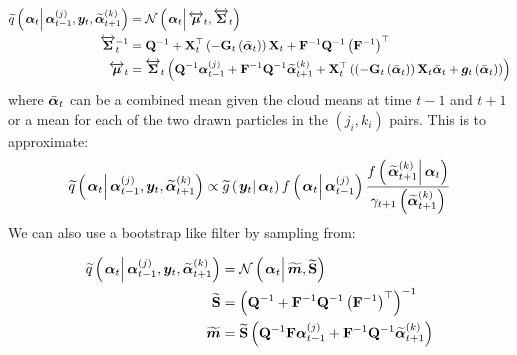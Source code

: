 \begin{equation}\begin{split}
	\IDAproxC{\vec{\alpha}_t}{\partic{\vec{\alpha}}{t-1}{j},\vec{y}_t, \particB{\vec{\alpha}}{t+1}{k}}  &=   %
		\normalC{\vec{\alpha}_t}{\vecLRarrow{\mu}_t}{\matLRarrow{\Sigma}_t} \\
%
	\matLRarrow{\Sigma}_t^{-1} &= 
		\mat{Q}^{-1} + 
		\mat{X}_t^\top\Lparen{-\mat{G}_t\Lparen{\vecb{\alpha}_{t}}}
		\mat{X}_t + \mat{F}^{-1}\mat{Q}^{-1}\Lparen{\mat{F}^{-1}}^\top  \\
%
	\vecLRarrow{\mu}_t 
	 &=  \matLRarrow{\Sigma}_t \Lparen{
		\mat{Q}^{-1}\partic{\vec{\alpha}}{t-1}{j} + 
		\mat{F}^{-1}\mat{Q}^{-1}\particB{\vec{\alpha}}{t + 1}{k} + 
		\mat{X}_t^\top
		\Lparen{
			\Lparen{-\mat{G}_t\Lparen{\vecb{\alpha}_{t}}}
			\mat{X}_t\vecb{\alpha}_{t} +
			\vec{g}_t\Lparen{\vecb{\alpha}_{t}}
		}}
\end{split}\end{equation}%
%
where $\bar{\bm{\alpha}}_{t}$ can be a combined mean given the cloud means at time $t - 1$ and $t + 1$ or a mean for each of the  two drawn particles in the $(j_i,k_i)$ pairs. This is to approximate:
%
%
\begin{equation}\begin{split}
	\IDAproxC{\vec{\alpha}_t}{\partic{\vec{\alpha}}{t-1}{j},\vec{y}_t, \particB{\vec{\alpha}}{t+1}{k}} \propto %
%
	\optorC{\widetilde{g}}{\vec{y}_t}{\vec{\alpha}_t}
		\optorC{f}{\vec{\alpha}_t}{\partic{\vec{\alpha}}{t-1}{j}}
		\frac{
			\optorC{f}{\particB{\vec{\alpha}}{t+1}{k}}{\vec{\alpha}_t}
		}{
			\gamma_{t + 1}\Lparen{\particB{\vec{\alpha}}{t+1}{k}}
		}
\end{split}\end{equation}
%
We can also use a bootstrap like filter by sampling from:

\begin{equation}\begin{split}
	\IDAproxC{\vec{\alpha}_t}{\partic{\vec{\alpha}}{t-1}{j},\vec{y}_t, \particB{\vec{\alpha}}{t+1}{k}} &=
		\normalC{\vec{\alpha}_t}{\vect{m}}{\matt{S}} \\
%
	\matt{S} &= \Lparen{\mat{Q}^{-1} + \mat{F}^{-1}\mat{Q}^{-1}\Lparen{\mat{F}^{-1}}^\top}^{-1} \\
% 
	\vect{m} &= \matt{S}\Lparen{
			 \mat{Q}^{-1}\mat{F}\partic{\vec{\alpha}}{t-1}{j} +
			 \mat{F}^{-1}\mat{Q}^{-1}\particB{\vec{\alpha}}{t + 1}{k}}
\end{split}\end{equation}

